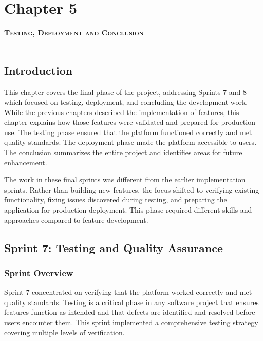 \chapter*{Chapter 5}

\textsc{\textbf{\Huge Testing, Deployment and Conclusion}} \\ \\


\section*{Introduction}

This chapter covers the final phase of the project, addressing
Sprints 7 and 8 which focused on testing, deployment, and
concluding the development work. While the previous chapters
described the implementation of features, this chapter explains
how those features were validated and prepared for production
use. The testing phase ensured that the platform functioned
correctly and met quality standards. The deployment phase
made the platform accessible to users. The conclusion summarizes
the entire project and identifies areas for future enhancement.

The work in these final sprints was different from the earlier
implementation sprints. Rather than building new features, the
focus shifted to verifying existing functionality, fixing issues
discovered during testing, and preparing the application for
production deployment. This phase required different skills and
approaches compared to feature development.

\section*{Sprint 7: Testing and Quality Assurance}

\subsection*{Sprint Overview}

Sprint 7 concentrated on verifying that the platform worked
correctly and met quality standards. Testing is a critical
phase in any software project that ensures features function
as intended and that defects are identified and resolved before
users encounter them. This sprint implemented a comprehensive
testing strategy covering multiple levels of verification.

